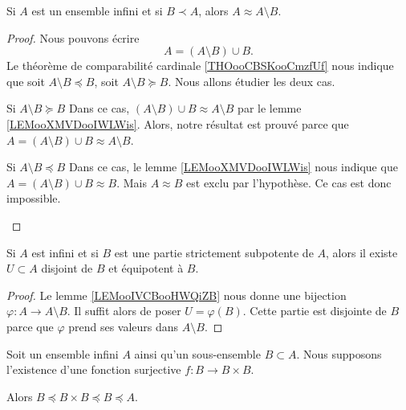 \begin{lemma}       \label{LEMooIVCBooHWQiZB}
    Si \( A\) est un ensemble infini et si \( B\prec A\), alors \( A\approx A\setminus B\).
\end{lemma}

\begin{proof}
    Nous pouvons écrire
    \begin{equation}
        A=(A\setminus B)\cup B.
    \end{equation}
    Le théorème de comparabilité cardinale \ref{THOooCBSKooCmzfUf} nous indique que soit \( A\setminus B\preceq B\), soit \( A\setminus B\succeq B\). Nous allons étudier les deux cas.
    \begin{subproof}
        \item[Si \( A\setminus B\succeq B\)] 
            Dans ce cas, \( (A\setminus B)\cup B\approx A\setminus B\) par le lemme \ref{LEMooXMVDooIWLWis}. Alors, notre résultat est prouvé parce que \( A=(A\setminus B)\cup B\approx A\setminus B\).
        \item[Si \( A\setminus B\preceq B\)] 
            Dans ce cas, le lemme \ref{LEMooXMVDooIWLWis} nous indique que \( A=(A\setminus B)\cup B\approx B\). Mais \( A\approx B\) est exclu par l'hypothèse. Ce cas est donc impossible.
    \end{subproof}
\end{proof}

\begin{lemma}        \label{LEMooMRVQooUZSSyL}
    Si \( A\) est infini et si \( B\) est une partie strictement subpotente de \( A\), alors il existe \( U\subset A\) disjoint de \( B\) et équipotent à \( B\).
\end{lemma}

\begin{proof}
    Le lemme \ref{LEMooIVCBooHWQiZB} nous donne une bijection \( \varphi\colon A\to A\setminus B\). Il suffit alors de poser \( U=\varphi(B)\). Cette partie est disjointe de \( B\) parce que \( \varphi\) prend ses valeurs dans \( A\setminus B\).
\end{proof}

\begin{lemma}
    Soit un ensemble infini \( A\) ainsi qu'un sous-ensemble \( B\subset A\). Nous supposons l'existence d'une fonction surjective \( f\colon B\to B\times B\).

    Alors \( B\preceq B\times B\preceq B\preceq A\).
\end{lemma}

